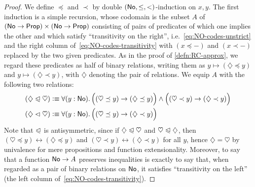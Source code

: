 \newcommand{\hle}{\diamondsuit\preceq}
\newcommand{\hlt}{\diamondsuit\prec}
\newcommand{\hlname}{\diamondsuit}
\newcommand{\hleb}{\heartsuit\preceq}
\newcommand{\hltb}{\heartsuit\prec}
\newcommand{\hlbname}{\heartsuit}
\newcommand{\tle}{\triangle\preceq}
\newcommand{\tlt}{\triangle\prec}
\newcommand{\tlname}{\triangle}
\newcommand{\tleb}{\square\preceq}
\newcommand{\tltb}{\square\prec}
\newcommand{\tlbname}{\square}
\begin{proof}
  We define $\preceq$ and $\prec$ by double $(\mathsf{No},\le,<)$-induction on $x,y$.
  The first induction is a simple recursion, whose codomain is the subset $A$ of $(\mathsf{No}\to\mathsf{Prop})\times (\mathsf{No}\to\mathsf{Prop})$ consisting of pairs of predicates of which one implies the other and which satisfy ``transitivity on the right'', i.e.~\eqref{eq:NO-codes-unstrict} and the right column of~\eqref{eq:NO-codes-transitivity} with $(x\preceq -)$ and $(x\prec -)$ replaced by the two given predicates.
  As in the proof of \autoref{defn:RC-approx}, we regard these predicates as half of binary relations, writing them as $y\mapsto (\hle y)$ and $y\mapsto (\hlt y)$, with $\hlname$ denoting the pair of relations.
  We equip $A$ with the following two relations:
  \begin{align*}
    (\hlname \ble \hlbname) &\defeq
    \fall{y:\NO} \Big( (\hleb y) \to (\hle y) \Big) \land
    \Big( (\hltb y) \to (\hlt y) \Big)\\
    (\hlname \blt \hlbname) &\defeq
    \fall{y:\NO} \Big( (\hleb y) \to (\hlt y) \Big)
  \end{align*}
  Note that $\trianglelefteqslant$ is antisymmetric, since if $\hlname \ble \hlbname$ and $\hlbname \ble \hlname$, then $(\hleb y) \leftrightarrow (\hle y)$ and $(\hltb y) \leftrightarrow (\hlt y)$ for all $y$, hence $\hlname=\hlbname$ by univalence for mere propositions and function extensionality.
  Moreover, to say that a function $\mathsf{No}\to A$ preserves inequalities is exactly to say that, when regarded as a pair of binary relations on $\mathsf{No}$, it satisfies ``transitivity on the left'' (the left column of~\eqref{eq:NO-codes-transitivity}).


\end{proof}
